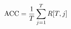 \documentclass[preview]{standalone}
\begin{document}
\begin{align*}
\special{dvisvgm:raw <g id='unique000'>}\text{ACC} = \frac{1}{T}\sum_{j=1}^{T} R[T,j]\special{dvisvgm:raw </g>}
\end{align*}
\end{document}

